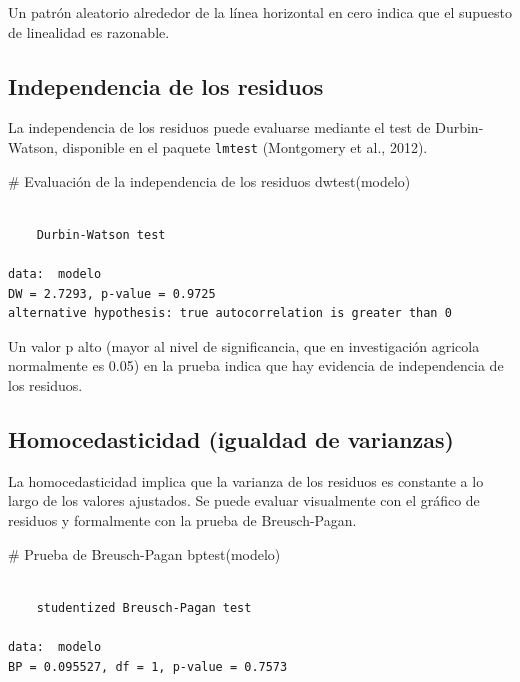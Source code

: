 \documentclass[
  spanish,
  a4paper,
  DIV=11,
  numbers=noendperiod,
  onepage,
  openany]{scrreprt}
\newenvironment{Shaded}{\begin{snugshade}}{\end{snugshade}}
\newcommand{\CommentTok}[1]{\textcolor[rgb]{0.37,0.37,0.37}{#1}}
\newcommand{\FunctionTok}[1]{\textcolor[rgb]{0.28,0.35,0.67}{#1}}
\newcommand{\NormalTok}[1]{\textcolor[rgb]{0.00,0.23,0.31}{#1}}
\begin{document}
Un patrón aleatorio alrededor de la línea horizontal en cero indica que
el supuesto de linealidad es razonable.

\subsection{Independencia de los
residuos}\label{independencia-de-los-residuos}

La independencia de los residuos puede evaluarse mediante el test de
Durbin-Watson, disponible en el paquete \texttt{lmtest} (Montgomery et
al., 2012).

\begin{Shaded}
\begin{Highlighting}[]
\CommentTok{\# Evaluación de la independencia de los residuos}
\FunctionTok{dwtest}\NormalTok{(modelo)}
\end{Highlighting}
\end{Shaded}

\begin{verbatim}

    Durbin-Watson test

data:  modelo
DW = 2.7293, p-value = 0.9725
alternative hypothesis: true autocorrelation is greater than 0
\end{verbatim}

Un valor p alto (mayor al nivel de significancia, que en investigación
agricola normalmente es 0.05) en la prueba indica que hay evidencia de
independencia de los residuos.

\subsection{Homocedasticidad (igualdad de
varianzas)}\label{homocedasticidad-igualdad-de-varianzas}

La homocedasticidad implica que la varianza de los residuos es constante
a lo largo de los valores ajustados. Se puede evaluar visualmente con el
gráfico de residuos y formalmente con la prueba de Breusch-Pagan.

\begin{Shaded}
\begin{Highlighting}[]
\CommentTok{\# Prueba de Breusch{-}Pagan}
\FunctionTok{bptest}\NormalTok{(modelo)}
\end{Highlighting}
\end{Shaded}

\begin{verbatim}

    studentized Breusch-Pagan test

data:  modelo
BP = 0.095527, df = 1, p-value = 0.7573
\end{verbatim}
\end{document}
